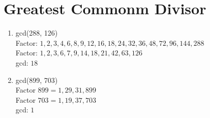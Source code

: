 \documentclass[11pt]{article}
\begin{document}
\section{Greatest Commonm Divisor}
\begin{enumerate}
\item 
gcd(288, 126)\\
Factor: $1, 2, 3, 4, 6, 8, 9, 12, 16, 18, 24, 32, 36, 48, 72, 96, 144, 288$\\
Factor: $1, 2, 3, 6, 7, 9, 14, 18, 21, 42, 63, 126$\\
gcd: $18$\\
\item
gcd(899, 703)\\
Factor $899 = 1, 29, 31, 899$\\
Factor $703 = 1, 19, 37, 703$\\
gcd: $1$\\
\end{enumerate}
\end{document}
